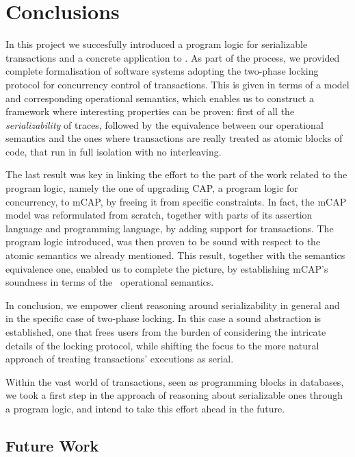 \section{Conclusions}

In this project we succesfully introduced a program logic for serializable transactions and a concrete application to \tpl. As part of the process, we provided complete formalisation of software systems adopting the two-phase locking protocol for concurrency control of transactions. This is given in terms of a model and corresponding operational semantics, which enables us to construct a framework where interesting properties can be proven: first of all the \textit{serializability} of traces, followed by the equivalence between our operational semantics and the ones where transactions are really treated as atomic blocks of code, that run in full isolation with no interleaving.

The last result was key in linking the effort to the part of the work related to the program logic, namely the one of upgrading CAP, a program logic for concurrency, to mCAP, by freeing it from specific constraints. In fact, the mCAP model was reformulated from scratch, together with parts of its assertion language and programming language, by adding support for transactions. The program logic introduced, was then proven to be sound with respect to the atomic semantics we already mentioned. This result, together with the semantics equivalence one, enabled us to complete the picture, by establishing mCAP's soundness in terms of the \tpl\ operational semantics.

In conclusion, we empower client reasoning around serializability in general and in the specific case of two-phase locking. In this case a sound abstraction is established, one that frees users from the burden of considering the intricate details of the locking protocol, while shifting the focus to the more natural approach of treating transactions' executions as serial.

Within the vast world of transactions, seen as programming blocks in databases, we took a first step in the approach of reasoning about serializable ones through a program logic, and intend to take this effort ahead in the future.

\subsection{Future Work}

